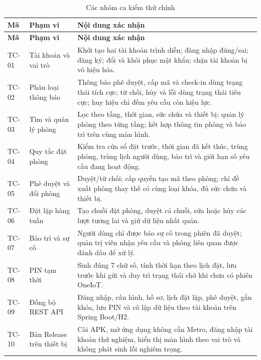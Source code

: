 \begin{longtable}{>{\raggedright\arraybackslash}p{1.2cm}>{\raggedright\arraybackslash}p{4.1cm}>{\raggedright\arraybackslash}p{7.4cm}}
\caption{Các nhóm ca kiểm thử chính}\label{tab:testcases}\\
\toprule
\rowcolor{RoomHubLight}
\textbf{Mã} & \textbf{Phạm vi} & \textbf{Nội dung xác nhận} \\
\midrule
\endfirsthead
\toprule
\rowcolor{RoomHubLight}
\textbf{Mã} & \textbf{Phạm vi} & \textbf{Nội dung xác nhận} \\
\midrule
\endhead
\bottomrule
\endfoot
TC-01 & Tài khoản và vai trò & Khởi tạo hai tài khoản trình diễn; đăng nhập đúng/sai; đăng ký; đổi và khôi phục mật khẩu; chặn tài khoản bị vô hiệu hóa. \\
TC-02 & Phân loại thông báo & Thông báo phê duyệt, cấp mã và check-in dùng trạng thái tích cực; từ chối, hủy và lỗi dùng trạng thái tiêu cực; huy hiệu chỉ đếm yêu cầu còn hiệu lực. \\
TC-03 & Tìm và quản lý phòng & Lọc theo tầng, thời gian, sức chứa và thiết bị; quản lý phòng theo từng tầng; kết hợp thông tin phòng và bảo trì trên cùng màn hình. \\
TC-04 & Quy tắc đặt phòng & Kiểm tra cửa sổ đặt trước, thời gian đã kết thúc, trùng phòng, trùng lịch người dùng, bảo trì và giới hạn số yêu cầu đang hoạt động. \\
TC-05 & Phê duyệt và đổi phòng & Duyệt/từ chối; cấp quyền tạo mã theo phòng; chỉ đề xuất phòng thay thế có cùng loại khóa, đủ sức chứa và thiết bị. \\
TC-06 & Đặt lặp hàng tuần & Tạo chuỗi đặt phòng, duyệt cả chuỗi, sửa hoặc hủy các lượt tương lai và giữ dữ liệu nhất quán. \\
TC-07 & Bảo trì và sự cố & Người dùng chỉ được báo sự cố trong phiên đã duyệt; quản trị viên nhận yêu cầu và phòng liên quan được đánh dấu để xử lý. \\
TC-08 & PIN tạm thời & Sinh đúng 7 chữ số, tính thời hạn theo lịch đặt, lưu trước khi gửi và duy trì trạng thái chờ khi chưa có phiên OneIoT. \\
TC-09 & Đồng bộ REST API & Đăng nhập, cấu hình, hồ sơ, lịch đặt lặp, phê duyệt, gắn khóa, lưu PIN và cô lập dữ liệu theo tài khoản trên Spring Boot/H2. \\
TC-10 & Bản Release trên thiết bị & Cài APK, mở ứng dụng không cần Metro, đăng nhập tài khoản thử nghiệm, hiển thị màn hình theo vai trò và không phát sinh lỗi nghiêm trọng. \\
\end{longtable}


